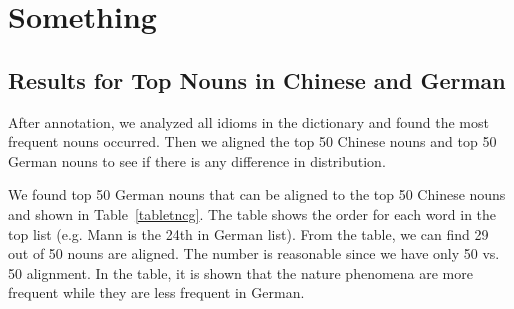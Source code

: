 \section{Something}\label{nouns}

\subsection{Results for Top Nouns in Chinese and German}\label{firstresult}
After annotation, we analyzed all idioms in the dictionary and found the most frequent nouns occurred. Then we aligned the top 50 Chinese nouns and top 50 German nouns to see if there is any difference in distribution. 

We found top 50 German nouns that can be aligned to the top 50 Chinese nouns and shown in Table~\ref{tabletncg}. The table shows the order for each word in the top list (e.g. Mann is the 24th in German list). From the table, we can find 29 out of 50 nouns are aligned. The number is reasonable since we have only 50 vs. 50 alignment. In the table, it is shown that the nature phenomena are more frequent while they are less frequent in German. 


